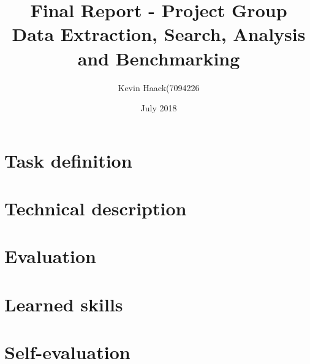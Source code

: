 \documentclass{llncs}
\title{Final Report - Project Group\\Data Extraction, Search, Analysis and Benchmarking}
\author{Kevin Haack(7094226}
\institute{Paderborn University\\
\email{khaack@mail.uni-paderborn.de}}
\date{July 2018}
\begin{document}
\maketitle
\clearpage

\section{Task definition}

\clearpage

\section{Technical description}

\clearpage

\section{Evaluation}

\clearpage

\section{Learned skills}

\clearpage

\section{Self-evaluation}

\clearpage
\end{document}
